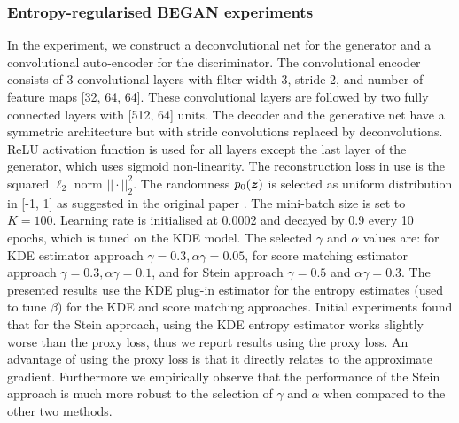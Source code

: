 \subsubsection{Entropy-regularised BEGAN experiments}
%
In the experiment, we construct a deconvolutional net for the generator and a convolutional auto-encoder for the discriminator. The convolutional encoder consists of 3 convolutional layers with filter width 3, stride 2, and number of feature maps [32, 64, 64]. These convolutional layers are followed by two fully connected layers with [512, 64] units. The decoder and the generative net have a symmetric architecture but with stride convolutions replaced by deconvolutions. ReLU activation function is used for all layers except the last layer of the generator, which uses sigmoid non-linearity. The reconstruction loss in use is the squared $\ell_2$ norm $|| \cdot ||_2^2$. The randomness $p_0(\bm{z})$ is selected as uniform distribution in [-1, 1] as suggested in the original paper \citep{berthelot:began2017}. The mini-batch size is set to $K = 100$. Learning rate is initialised at 0.0002 and decayed by 0.9 every 10 epochs, which is tuned on the KDE model. The selected $\gamma$ and $\alpha$ values are: for KDE estimator approach $\gamma = 0.3, \alpha \gamma = 0.05$, for score matching estimator approach $\gamma = 0.3, \alpha \gamma = 0.1$, and for Stein approach $\gamma = 0.5$ and $\alpha \gamma = 0.3$. The presented results use the KDE plug-in estimator for the entropy estimates (used to tune $\beta$) for the KDE and score matching approaches. Initial experiments found that for the Stein approach, using the KDE entropy estimator works slightly worse than the proxy loss, thus we report results using the proxy loss. An advantage of using the proxy loss is that it directly relates to the approximate gradient. Furthermore we empirically observe that the performance of the Stein approach is much more robust to the selection of $\gamma$ and $\alpha$ when compared to the other two methods. 
